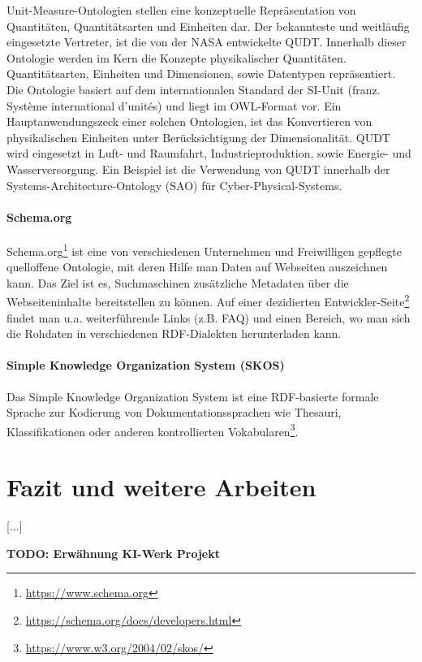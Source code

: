 \documentclass{article}
\begin{document}
Unit-Measure-Ontologien stellen eine konzeptuelle Repräsentation von Quantitäten, Quantitätsarten und Einheiten dar.
Der bekannteste und weitläufig eingesetzte Vertreter, ist die von der NASA entwickelte QUDT\cite{QUDTOntology}.
Innerhalb dieser Ontologie werden im Kern die Konzepte physikalischer Quantitäten.
Quantitätsarten, Einheiten und Dimensionen, sowie Datentypen repräsentiert.
Die Ontologie basiert auf dem internationalen Standard der SI-Unit (franz. Système international d'unités) und liegt im OWL-Format vor. Ein Hauptanwendungszeck einer solchen Ontologien, ist das Konvertieren von physikalischen  Einheiten unter Berücksichtigung der Dimensionalität.
QUDT wird eingesetzt in Luft- und Raumfahrt, Industrieproduktion, sowie Energie- und Wasserversorgung.
Ein Beispiel ist die Verwendung von QUDT innerhalb der Systems-Architecture-Ontology (SAO) für Cyber-Physical-Systems.

\paragraph{Schema.org}

Schema.org\footnote{\url{https://www.schema.org}} ist eine von verschiedenen Unternehmen und Freiwilligen gepflegte quelloffene Ontologie, mit deren Hilfe man Daten auf Webseiten auszeichnen kann.
Das Ziel ist es, Suchmaschinen zusätzliche Metadaten über die Webseiteninhalte bereitstellen zu können.
Auf einer dezidierten Entwickler-Seite\footnote{\url{https://schema.org/docs/developers.html}} findet man u.a. weiterführende Links (z.B. FAQ) und einen Bereich, wo man sich die Rohdaten in verschiedenen RDF-Dialekten herunterladen kann.

\paragraph{Simple Knowledge Organization System (SKOS)}

Das Simple Knowledge Organization System ist eine RDF-basierte formale Sprache zur Kodierung von Dokumentationssprachen wie Thesauri, Klassifikationen oder anderen kontrollierten Vokabularen\footnote{\url{https://www.w3.org/2004/02/skos/}}.



\section{Fazit und weitere Arbeiten}

[...]

\textbf{TODO: Erwähnung KI-Werk Projekt}



\medskip

\printbibliography
\end{document}
